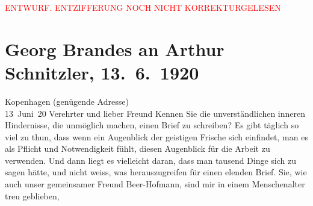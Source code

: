 
\begin{center}
            \textcolor{red}{ENTWURF. ENTZIFFERUNG NOCH NICHT KORREKTURGELESEN}
                      \end{center}
            
               \section[Georg Brandes an Arthur Schnitzler, 13. 6. 1920]{ Georg Brandes an Arthur Schnitzler, 13. 6. 1920}\nopagebreak{}\rehead{ }\begin{ledgroupsized}[t]{13cm}\normalsize\beginnumbering{} \toendnotes[C]{\smallbreak\pagebreak[2]} 
\toendnotes[C]{\smallbreak}\pstart
           \raggedleft{}{\pb}Kopenhagen (genügende Adresse){\\}13 Juni 20\pend
           \pstart{}Verehrter und lieber Freund \pend\pstart
           Kennen Sie die unverständlichen inneren Hindernisse, die \label{T_L02342_1v}\label{T_L02342_1h} unmöglich machen,
               einen Brief zu schreiben? Es gibt täglich so viel zu thun, dass wenn ein Augenblick
               der geistigen Frische sich einfindet, man es als Pflicht und Notwendigkeit fühlt,
               diesen Augenblick für die Arbeit zu verwenden. Und dann liegt es vielleicht daran,
               dass man tausend Dinge sich zu sagen hätte, und nicht weiss, was herauszugreifen für
               einen elenden Brief. Sie, wie auch unser gemeinsamer Freund Beer-Hofmann, sind mir in einem Menschenalter treu geblieben,

\end{ledgroupsized}
